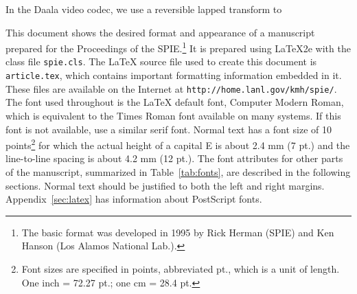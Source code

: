 \documentclass[a4paper]{spie}  %
\begin{document}
In the Daala video codec, we use a reversible lapped transform to 

This document shows the desired format and appearance of a manuscript prepared for the Proceedings of the SPIE.\footnote{The basic format was developed in 1995 by Rick Herman (SPIE) and Ken Hanson (Los Alamos National Lab.).} It is prepared using LaTeX2e\cite{Lamport94} with the class file {\tt spie.cls}.  The LaTeX source file used to create this document is {\tt article.tex}, which contains important formatting information embedded in it.  These files are available on the Internet at {\tt http://home.lanl.gov/kmh/spie/}.  The font used throughout is the LaTeX default font, Computer Modern Roman, which is equivalent to the Times Roman font available on many systems.  If this font is not available, use a similar serif font.  Normal text has a font size of 10 points\footnote{Font sizes are specified in points, abbreviated pt., which is a unit of length.  One inch = 72.27 pt.; one cm = 28.4 pt.} for which the actual height of a capital E is about 2.4 mm (7 pt.) and the line-to-line spacing is about 4.2 mm (12 pt.).  The font attributes for other parts of the manuscript, summarized in Table~\ref{tab:fonts}, are described in the following sections.  Normal text should be justified to both the left and right margins.  Appendix~\ref{sec:latex} has information about PostScript fonts.
\end{document}
